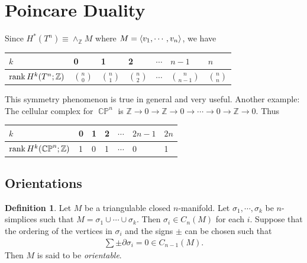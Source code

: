 \documentclass[psamsfonts]{amsart}
\theoremstyle{definition}
\newtheorem{defn}[thm]{Definition}
\theoremstyle{rem}
\DeclareMathOperator{\CP}{\mathbb{C}\mathbb{P}}
\numberwithin{equation}{section}
\begin{document}
\section{Poincare Duality}

Since $H^{\ast}(T^n) \equiv \wedge_{\mathbb{Z}} M$ where $M = \ev{ v_1, \cdots, v_n }$, we have

\begin{center}
  \begin{tabular}{| l | l | l | l | l | l | l |} \hline
    $k$                          & 0 & 1 & 2 & $\cdots$ & $n - 1$  & $n$ \\ \hline
    $\rank H^k(T^n; \mathbb{Z})$ & $\binom{n}{0}$ & $\binom{n}{1}$ & $\binom{n}{2}$ & $\cdots$ & $\binom{n}{n - 1}$ & $\binom{n}{n}$ \\ \hline
  \end{tabular}
\end{center}

This symmetry phenomenon is true in general and very useful.
Another example: The cellular complex for $\CP^n$ is $\mathbb{Z} \rightarrow 0 \rightarrow \mathbb{Z} \rightarrow 0 \rightarrow \cdots \rightarrow 0 \rightarrow \mathbb{Z} \rightarrow 0$.
Thus

\begin{center}
  \begin{tabular}{| l | l | l | l | l | l | l |} \hline
    $k$                          & 0 & 1 & 2 & $\cdots$ & $2n - 1$  & $2n$ \\ \hline
    $\rank H^k(\CP^n; \mathbb{Z})$ & 1 & 0 & 1 & $\cdots$ & 0         & 1 \\
    \hline
  \end{tabular}
\end{center}

\subsection{Orientations}

\begin{defn}
  Let $M$ be a triangulable closed $n$-manifold.
  Let $\sigma_1, \cdots, \sigma_k$ be $n$-simplices such that $M = \sigma_1 \cup \cdots \cup \sigma_k$.
  Then $\sigma_i \in C_n(M)$ for each $i$.
  Suppose that the ordering of the vertices in $\sigma_i$ and the signs $\pm$ can be chosen such that
  \begin{align*}
    \sum \pm \partial \sigma_i = 0 \in C_{n - 1}(M).
  \end{align*}
  Then $M$ is said to be \textit{orientable}.
\end{defn}
\end{document}
